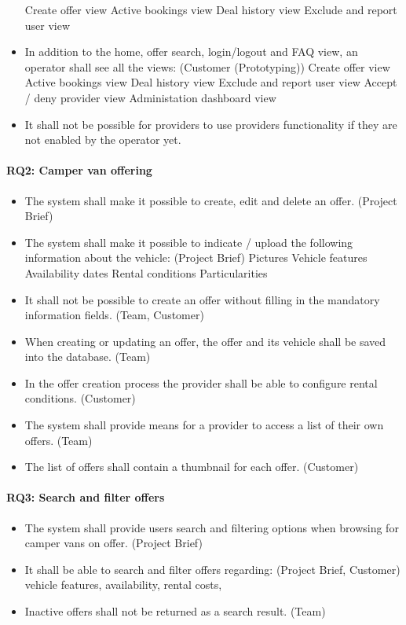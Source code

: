 \begin{itemize}
        \subitem Create offer view
        \subitem Active bookings view
        \subitem Deal history view
        \subitem Exclude and report user view
    \item In addition to the home, offer search, login/logout and FAQ view, an operator shall see all the views: (Customer (Prototyping))
        \subitem Create offer view
        \subitem Active bookings view
        \subitem Deal history view
        \subitem Exclude and report user view
        \subitem Accept / deny provider view
        \subitem Administation dashboard view
    \item It shall not be possible for providers to use providers functionality if they are not enabled by the operator yet.
\end{itemize}


\paragraph{RQ2: Camper van offering}
\begin{itemize}
    \item The system shall make it possible to create, edit and delete an offer. (Project Brief)
    \item The system shall make it possible to indicate / upload the following information about the vehicle: (Project Brief)
        \subitem Pictures
        \subitem Vehicle features
        \subitem Availability dates
        \subitem Rental conditions
        \subitem Particularities
    \item It shall not be possible to create an offer without filling in the mandatory information fields. (Team, Customer)
    \item When creating or updating an offer, the offer and its vehicle shall be saved into the database. (Team)
    \item In the offer creation process the provider shall be able to configure rental conditions. (Customer)
    \item The system shall provide means for a provider to access a list of their own offers. (Team)
    \item The list of offers shall contain a thumbnail for each offer. (Customer)
\end{itemize}

\paragraph{RQ3: Search and filter offers}
\begin{itemize}
    \item The system shall provide users search and filtering options when browsing for camper vans on offer. (Project Brief)
    \item It shall be able to search and filter offers regarding: (Project Brief, Customer)
        \subitem vehicle features,
        \subitem availability,
        \subitem rental costs,
    \item Inactive offers shall not be returned as a search result. (Team)
\end{itemize}


